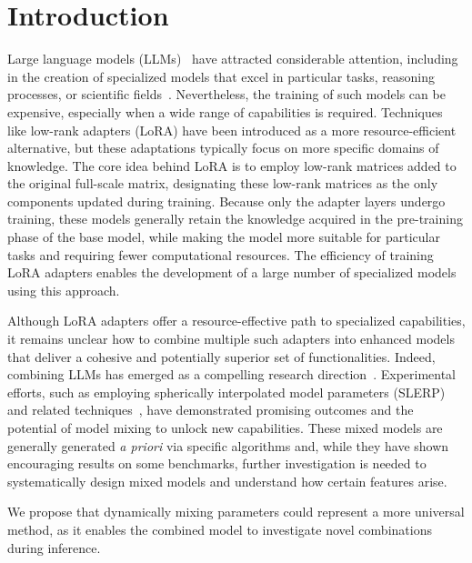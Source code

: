 \section{Introduction}
Large language models (LLMs)~\cite{Vaswani2017AttentionNeedc,Touvron2023LlamaModels,OpenAI2023GPT-4Report,Chowdhery2022PaLM:Pathways,Jiang2023Mistral7B,Gunasekar2023TextbooksNeed} have attracted considerable attention, including in the creation of specialized models that excel in particular tasks, reasoning processes, or scientific fields~\cite{Bubeck2023SparksGPT-4,Buehler2023MechGPTModalities,Nejjar2023LLMsAnalysis,Buehler2023GenerativeDesign,Luu2023BioinspiredLLM:Materials,Luu2023GenerativeSolvents,Buehler2023MeLMProblemsb,Ge2023OpenAGI:Experts}. Nevertheless, the training of such models can be expensive, especially when a wide range of capabilities is required. Techniques like low-rank adapters (LoRA)\cite{hu2021lora} have been introduced as a more resource-efficient alternative, but these adaptations typically focus on more specific domains of knowledge. The core idea behind LoRA is to employ low-rank matrices added to the original full-scale matrix, designating these low-rank matrices as the only components updated during training. Because only the adapter layers undergo training, these models generally retain the knowledge acquired in the pre-training phase of the base model, while making the model more suitable for particular tasks and requiring fewer computational resources. The efficiency of training LoRA adapters enables the development of a large number of specialized models using this approach.

Although LoRA adapters offer a resource-effective path to specialized capabilities, it remains unclear how to combine multiple such adapters into enhanced models that deliver a cohesive and potentially superior set of functionalities. Indeed, combining LLMs has emerged as a compelling research direction~\cite{Kim2023SOLARUp-Scaling}. Experimental efforts, such as employing spherically interpolated model parameters (SLERP) and related techniques~\cite{Arcee-ai/mergekit:Models.}, have demonstrated promising outcomes and the potential of model mixing to unlock new capabilities. These mixed models are generally generated {\it a priori} via specific algorithms and, while they have shown encouraging results on some benchmarks, further investigation is needed to systematically design mixed models and understand how certain features arise.

We propose that dynamically mixing parameters could represent a more universal method, as it enables the combined model to investigate novel combinations during inference.

